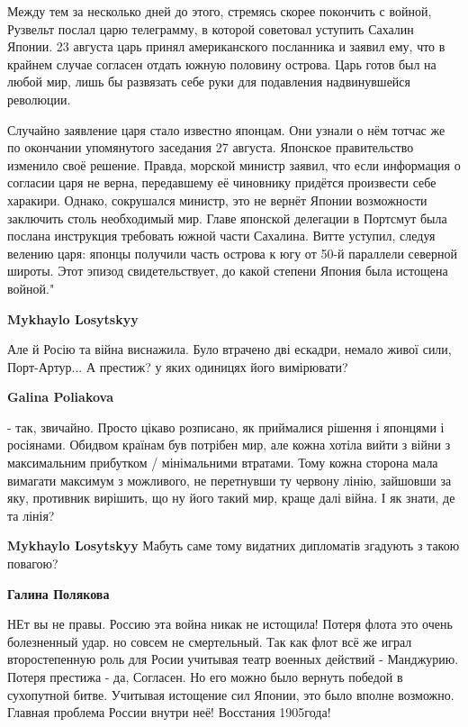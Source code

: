 \begin{itemize}
Между тем за несколько дней до этого, стремясь скорее покончить с войной,
Рузвельт послал царю телеграмму, в которой советовал уступить Сахалин Японии.
23 августа царь принял американского посланника и заявил ему, что в крайнем
случае согласен отдать южную половину острова. Царь готов был на любой мир,
лишь бы развязать себе руки для подавления надвинувшейся революции.

Случайно заявление царя стало известно японцам. Они узнали о нём тотчас же по
окончании упомянутого заседания 27 августа. Японское правительство изменило
своё решение. Правда, морской министр заявил, что если информация о согласии
царя не верна, передавшему её чиновнику придётся произвести себе харакири.
Однако, сокрушался министр, это не вернёт Японии возможности заключить столь
необходимый мир. Главе японской делегации в Портсмут была послана инструкция
требовать южной части Сахалина. Витте уступил, следуя велению царя: японцы
получили часть острова к югу от 50-й параллели северной широты. Этот эпизод
свидетельствует, до какой степени Япония была истощена войной."

\begin{itemize} %
\textbf{Mykhaylo Losytskyy} 

Але й Росію та війна виснажила. Було втрачено дві ескадри, немало живої сили,
Порт-Артур... А престиж? у яких одиницях його вимірювати?

\begin{itemize} %
\textbf{Galina Poliakova} 

- так, звичайно. Просто цікаво розписано, як приймалися рішення і японцями і
росіянами. Обидвом країнам був потрібен мир, але кожна хотіла вийти з війни з
максимальним прибутком / мінімальними втратами. Тому кожна сторона мала
вимагати максимум з можливого, не перетнувши ту червону лінію, зайшовши за яку,
противник вирішить, що ну його такий мир, краще далі війна. І як знати, де та
лінія?

\textbf{Mykhaylo Losytskyy} Мабуть саме тому видатних дипломатів згадують з такою повагою?

\textbf{Галина Полякова} 

НЕт вы не правы. Россию эта война никак не истощила! Потеря флота это очень
болезненный удар. но совсем не смертельный. Так как флот всё же играл
второстепенную роль для Росии учитывая театр военных действий - Манджурию.
Потеря престижа - да, Согласен. Но его можно было вернуть победой в сухопутной
битве. Учитывая истощение сил Японии, это было вполне возможно. Главная
проблема России внутри неё! Восстания 1905года!


\end{itemize}
\end{itemize}
\end{itemize}
